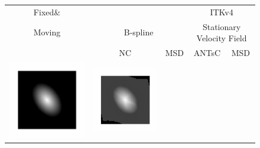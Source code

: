 \begin{figure}[!tb]
\centering
\begin{tabular}{c@{}c@{}c@{}c@{}c}
Fixed\& &\multicolumn{2}{c}{\elastix{}} & \multicolumn{2}{c}{ITKv4 }\\
Moving  &\multicolumn{2}{c}{B-spline} & \multicolumn{2}{c}{\small Stationary Velocity Field}\\
        &NC & MSD & ANTsC & MSD\\
\hline
  \includegraphics[scale=0.18,trim={5ex 5ex 5ex 5ex},clip=true]{ScriptedImages/fixed.pdf}&
  \includegraphics[scale=0.18,trim={5ex 5ex 5ex 5ex},clip=true]{ScriptedImages/elastix_BS_NCC_Image.pdf}&

\end{tabular}
\end{figure}
